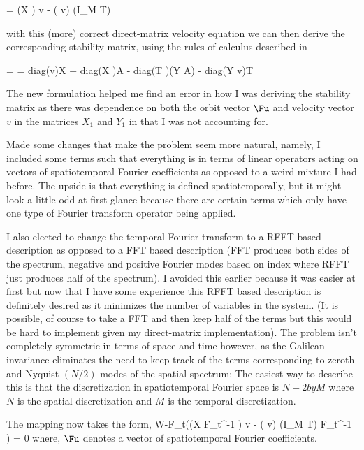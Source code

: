 \beq \label{e-KSsymDMvelnew}
 = (X \cdot \Fu) \ast v - ( \cdot v) \ast (I_M \otimes T) \cdot \Fu
\eeq

with this (more) correct direct-matrix velocity equation we can then derive the corresponding stability matrix,
using the rules of calculus described in 

\beq \label{e-KSsymDMstbnew}
 =  = diag(v)\cdot X + diag(X \cdot \Fu )\cdot A - diag(T \cdot \Fu)\cdot (Y \cdot A) - diag(Y \cdot v)\cdot T
\eeq

The new formulation helped me find an error in how I was deriving the stability matrix as there was dependence on
both the orbit vector $\Fu$ and velocity vector $v$ in the matrices $X_1$ and $Y_1$ in  that
I was not accounting for.



Made some changes that make the problem seem more natural, namely, I included some terms such that everything
is in terms of linear operators acting on vectors of spatiotemporal Fourier coefficients as opposed
to a weird mixture I had before. The upside is that everything is defined spatiotemporally, but it might
look a little odd at first glance because there are certain terms which only have one type of Fourier transform operator being applied.

I also elected to change the temporal Fourier transform to a RFFT based description as opposed to a FFT
based description (FFT produces both sides of the spectrum, negative and positive Fourier modes based on index
where RFFT just produces half of the spectrum). I avoided this earlier because it was easier at first but
now that I have some experience this RFFT based description is definitely desired as it minimizes the number
of variables in the system. (It is possible, of course to take a FFT and then keep half of the terms but
this would be hard to implement given my direct-matrix implementation). The problem isn't completely
symmetric in terms of space and time however, as the Galilean invariance eliminates the need to keep
track of the terms corresponding to zeroth and Nyquist $(N/2)$ modes of the spatial spectrum; The easiest
way to describe this is that the discretization in spatiotemporal Fourier space is $N-2 by M$ where $N$
is the spatial discretization and $M$ is the temporal discretization.


The mapping now takes the form,
\beq \label{e-symredmapping}
W\cdot \Fu -F_t\cdot((X \cdot F_t^{-1} \Fu) \ast v - ( \cdot v) \ast (I_M \otimes T) \cdot F_t^{-1} \cdot \Fu) = 0
\eeq
where, $\Fu$ denotes a vector of spatiotemporal Fourier coefficients.

